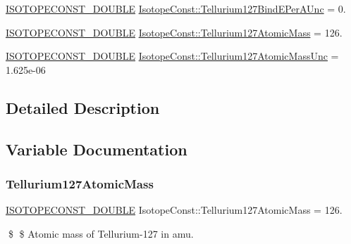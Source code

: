 \begin{DoxyCompactItemize}
\mbox{\hyperlink{group___isotope_const-_macros_ga8f45a7272ce02c0b4c65c44636ed719a}{I\+S\+O\+T\+O\+P\+E\+C\+O\+N\+S\+T\+\_\+\+D\+O\+U\+B\+LE}} \mbox{\hyperlink{group___isotope_const-_tellurium-_te127_gadf6a74f795dd3f2f58390f1c83aa8425}{Isotope\+Const\+::\+Tellurium127\+Bind\+E\+Per\+A\+Unc}} = 0.
\item 
\mbox{\hyperlink{group___isotope_const-_macros_ga8f45a7272ce02c0b4c65c44636ed719a}{I\+S\+O\+T\+O\+P\+E\+C\+O\+N\+S\+T\+\_\+\+D\+O\+U\+B\+LE}} \mbox{\hyperlink{group___isotope_const-_tellurium-_te127_gad7050091b25b9ae6f4e69f83c3755214}{Isotope\+Const\+::\+Tellurium127\+Atomic\+Mass}} = 126.
\item 
\mbox{\hyperlink{group___isotope_const-_macros_ga8f45a7272ce02c0b4c65c44636ed719a}{I\+S\+O\+T\+O\+P\+E\+C\+O\+N\+S\+T\+\_\+\+D\+O\+U\+B\+LE}} \mbox{\hyperlink{group___isotope_const-_tellurium-_te127_gaa06030815ff5084ebc1fe328167024dd}{Isotope\+Const\+::\+Tellurium127\+Atomic\+Mass\+Unc}} = 1.\+625e-\/06
\end{DoxyCompactItemize}


\subsection{Detailed Description}


\subsection{Variable Documentation}
\mbox{\label{group___isotope_const-_tellurium-_te127_gad7050091b25b9ae6f4e69f83c3755214}} 
\subsubsection{\texorpdfstring{Tellurium127\+Atomic\+Mass}{Tellurium127AtomicMass}}
{\footnotesize\ttfamily \mbox{\hyperlink{group___isotope_const-_macros_ga8f45a7272ce02c0b4c65c44636ed719a}{I\+S\+O\+T\+O\+P\+E\+C\+O\+N\+S\+T\+\_\+\+D\+O\+U\+B\+LE}} Isotope\+Const\+::\+Tellurium127\+Atomic\+Mass = 126.}

\$ \$ Atomic mass of Tellurium-\/127 in amu. \mbox{\label{group___isotope_const-_tellurium-_te127_gaa06030815ff5084ebc1fe328167024dd}} 
